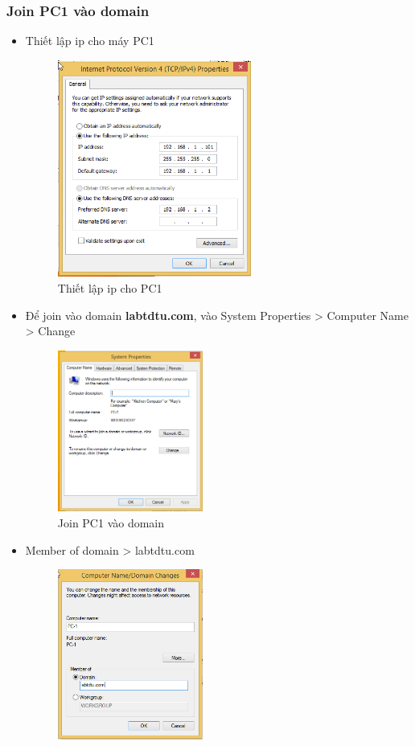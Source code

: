 \documentclass[13pt]{report}
\begin{document}
	\subsubsection{Join PC1 vào domain}
	\begin{itemize}
		\item Thiết lập ip cho máy PC1
		\begin{figure}[htp]
			\centering
			\includegraphics[width=0.6\textwidth]{image/Gui/FIT-PC/1.png}
			\caption{Thiết lập ip cho PC1}
		\end{figure}
		\newpage\item Để join vào domain \textbf{labtdtu.com}, vào System Properties > Computer Name > Change
		\begin{figure}[htp]
			\centering
			\includegraphics[width=0.45\textwidth]{image/Gui/FIT-PC/2.png}
			\caption{Join PC1 vào domain}
		\end{figure}
		\item Member of domain > labtdtu.com
		\begin{figure}[htp]
			\centering
			\includegraphics[width=0.45\textwidth]{image/Gui/FIT-PC/3.png}

\end{figure}
\end{itemize}
\end{document}
